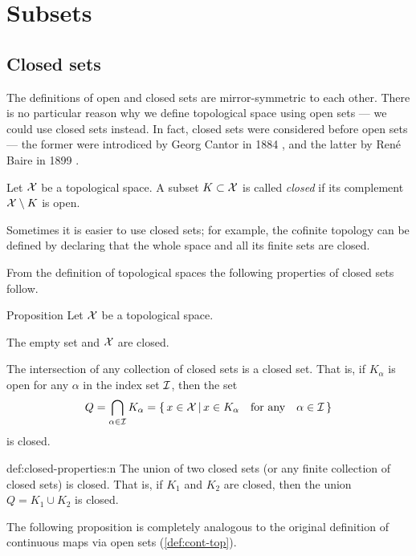 \chapter{Subsets}

\section{Closed sets}\label{sec:closed-sets}

The definitions of open and closed sets are mirror-symmetric to each other.
There is no particular reason why we define topological space using open sets --- we could use closed sets instead.
In fact, closed sets were considered before open sets --- the former were introdiced by Georg Cantor in 1884 \cite{cantor}, and the latter by René Baire in 1899 \cite{baire}.

Let $\mathcal{X}$ be a topological space. 
A subset $K\subset \mathcal{X}$ is called \emph{closed} if its complement $\mathcal{X}\setminus K$ is open.

Sometimes it is easier to use closed sets; 
for example, the cofinite topology can be defined by declaring that the whole space and all its finite sets are closed.

From the definition of topological spaces the following properties of closed sets follow.

\begin{thm}{Proposition}\label{prop:closed-properties}
Let $\mathcal{X}$ be a topological space. 
\begin{subthm}{}
 The empty set and $\mathcal{X}$ are closed.
\end{subthm}

\begin{subthm}{}
 The intersection of any collection of closed sets is a closed set.
That is, if $K_\alpha$ is open for any $\alpha$ in the index set $\mathcal{I}$,
then the set
\[Q=\bigcap_{\alpha\in \mathcal{I}} K_\alpha
=
\left\{\,{x\in \mathcal{X}}\,\middle|\,{x\in K_\alpha\quad\text{for any}\quad\alpha\in \mathcal{I}}\,\right\}\]
is closed.
\end{subthm}

\begin{subthm}{def:closed-properties:n}
The union of two closed sets (or any finite collection of closed sets) is closed.  
That is,  if $K_1$ and $K_2$ are closed, then the union $Q=K_1 \cup K_2$ is closed. 
\end{subthm}

\end{thm}

The following proposition is completely analogous to the original definition of continuous maps via open sets (\ref{def:cont-top}). 

